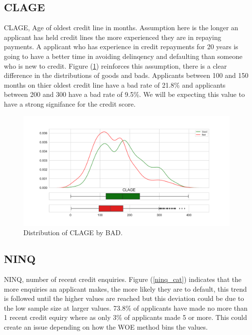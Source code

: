 \subsection*{CLAGE}

CLAGE, Age of oldest credit line in months. Assumption here is the longer an applicant has held credit lines the more experienced they are in repaying payments. A applicant who has experience in credit repayments for 20 years is going to have a better time in avoiding delinqency and defaulting than someone who is new to credit. Figure (\ref{clage_dist}) reinforces this assumption,  there is a clear difference in the distributions of goods and bads. Applicants between 100 and 150 months on thier oldest credit line have a bad rate of 21.8\% and applicants between 200 and 300 have a bad rate of 9.5\%. We will be expecting this value to have a strong signifance for the credit score.

\begin{figure}[H]
	\centering
	\includegraphics[scale=0.40]{figs/clage_dist.pdf}
	\caption{Distribution of CLAGE by BAD. \label{clage_dist}}
\end{figure}

\subsection*{NINQ}

NINQ,  number of recent credit enquiries. Figure (\ref{ninq_cat}) indicates that the more enquiries an applicant makes, the more likely they are to default, this trend is followed until the higher values are reached but this deviation could be due to the low sample size at larger values. 73.8\% of applicants have made no more than 1 recent credit equiry where as only 3\% of applicants made 5 or more. This could create an issue depending on how the WOE method bins the values.

